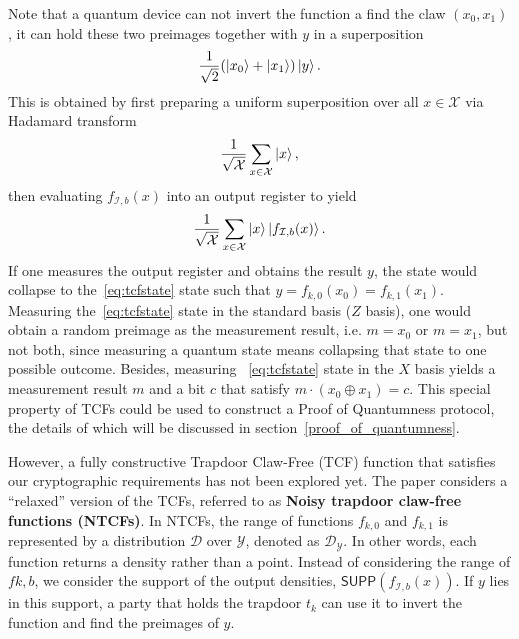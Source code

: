 \noindent Note that a quantum device can not invert the function a find the claw $(x_0,x_1)$, it can hold these two preimages together with $y$ in a superposition
\begin{align}
    \frac{1}{\sqrt{2}}(\ket{x_0}+\ket{x_1})\ket{y}.
    \label{eq:tcfstate}
\end{align}
This is obtained by first preparing a uniform superposition over all $x\in\mathcal{X}$ via Hadamard transform
\begin{align}
    \frac{1}{\sqrt{\mathcal{X}}}\sum_{x\in\mathcal{X}}\ket{x},
\end{align}
then evaluating $f_{\mathcal{I},b}(x)$ into an output register to yield 
\begin{align}
    \frac{1}{\sqrt{\mathcal{X}}}\sum_{x\in\mathcal{X}}\ket{x}\ket{f_{\mathcal{I},b}(x)}.
\end{align}
If one measures the output register and obtains the result $y$, the state would collapse to the~\eqref{eq:tcfstate} state such that $y=f_{k,0}(x_0)=f_{k,1}(x_1)$.
Measuring the~\eqref{eq:tcfstate} state in the standard basis ($Z$ basis), one would obtain a random preimage as the measurement result, i.e. $m=x_0$ or $m = x_1$, but not both, since measuring a quantum state means collapsing that state to one possible outcome. Besides, measuring ~\eqref{eq:tcfstate} state in the $X$ basis yields a measurement result $m$ and a bit $c$ that satisfy $m \cdot (x_0\oplus x_1) = c$. This special property of TCFs could be used to construct a Proof of Quantumness protocol, the details of which will be discussed in section~\ref{proof_of_quantumness}.



However, a fully constructive Trapdoor Claw-Free (TCF) function that satisfies our cryptographic requirements has not been explored yet. The paper \cite{Brakerski18_Interactiveproofofquantumness} considers a ``relaxed'' version of the TCFs, referred to as \textbf{Noisy trapdoor claw-free functions (NTCFs)}. In NTCFs, the range of functions $f_{k,0}$ and $f_{k,1}$ is represented by a distribution $\mathcal{D}$ over $\mathcal{Y}$, denoted as $\mathcal{D}_{\mathcal{Y}}$. In other words, each function returns a density rather than a point. Instead of considering the range of $f{k,b}$, we consider the support of the output densities, $\mathsf{SUPP}(f_{\mathcal{I},b}(x))$. If $y$ lies in this support, a party that holds the trapdoor $t_k$ can use it to invert the function and find the preimages of $y$.

